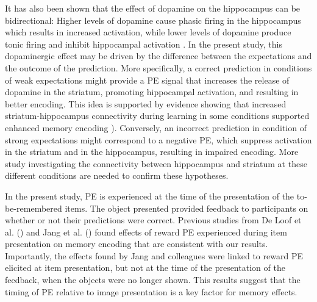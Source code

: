 \documentclass[a4paper,12pt]{article}
\begin{document}
It has also been shown that the effect of dopamine on the hippocampus can be bidirectional: Higher levels of dopamine cause phasic firing in the hippocampus which results in increased activation, while lower levels of dopamine produce tonic firing and inhibit hippocampal activation \citep{rosen2015midbrain}. In the present study, this dopaminergic effect may be driven by the difference between the expectations and the outcome of the prediction. More specifically, a correct prediction in conditions of weak expectations might provide a PE signal that increases the release of dopamine in the striatum, promoting hippocampal activation, and resulting in better encoding. This idea is supported by evidence showing that increased striatum-hippocampus connectivity during learning in some conditions supported enhanced memory encoding \citep{Davidow2016}). Conversely, an incorrect prediction in condition of strong expectations might correspond to a negative PE, which suppress activation in the striatum and in the hippocampus, resulting in impaired encoding. More study investigating the connectivity between hippocampus and striatum at these different conditions are needed to confirm these hypotheses. 
\par 
In the present study, PE is experienced at the time of the presentation of the to-be-remembered items. The object presented provided feedback to participants on whether or not their predictions were correct. Previous studies from De Loof et al. (\citeyear{de2018signed}) and Jang et al. (\citeyear{Jang2019}) found effects of reward PE experienced during item presentation on memory encoding that are consistent with our results. Importantly, the effects found by Jang and colleagues were linked to reward PE elicited at item presentation, but not at the time of the presentation of the feedback, when the objects were no longer shown. This results suggest that the timing of PE relative to image presentation is a key factor for memory effects. 
\par
\end{document}

